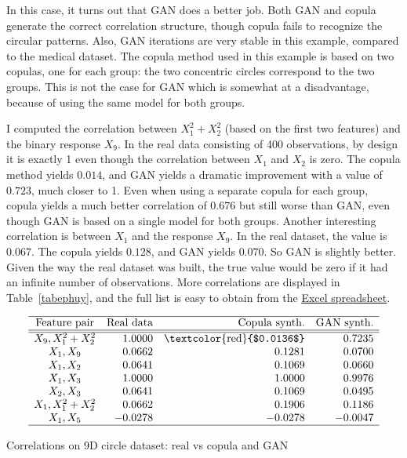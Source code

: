 \documentclass[oneside,10pt]{book}
\renewcommand{\arraystretch}{1.4} %
\begin{document}
In this case, it turns out that GAN does a better job. Both GAN and copula generate the correct correlation structure, though copula fails to recognize the circular patterns. Also, GAN iterations are very stable in this example, compared to the medical dataset.
The copula method used in this example is based on two copulas, one for each group: the two concentric circles correspond to the two groups. This is not the case for GAN which is  somewhat at a disadvantage,
 because of using the same model for both groups.

I computed the correlation between $X_1^2 + X_2^2$ (based on the first two features) and the binary response $X_9$. In the real data consisting of 400 observations, by design it is exactly 1 even though the correlation between $X_1$ and $X_2$ is zero.
The copula method yields $0.014$, and GAN yields a dramatic improvement with a value of $0.723$, much closer to 1. Even when using a separate copula
 for each group, copula yields a much better correlation of $0.676$ but still worse than GAN, even though GAN  is based on  a single model for both groups. Another interesting correlation is between $X_1$ and the response $X_9$. In the real dataset,
 the value is $0.067$. The copula yields
$0.128$, and GAN yields $0.070$.  So GAN is slightly better.
Given the way the real dataset was built, the true value would be zero if it had an infinite number
of observations.  More correlations are displayed in Table~\ref{tabephuy}, and the full list is easy to obtain from the
\href{https://github.com/VincentGranville/Main/blob/main/circle8D.xlsx}{Excel spreadsheet}.


\renewcommand{\arraystretch}{1.2} %
\renewcommand{\arraystretch}{1.2} %
\begin{table}[H]
\[
\begin{array}{crrr}
\hline
 \text{Feature pair} &  \text{Real data} & \text{Copula synth.} & \text{GAN synth.} \\
\hline
\hline
X_9, X_1^2+X_2^2  & 1.0000 & \text{\textcolor{red}{$0.0136$}} & 0.7235 \\
X_1, X_9 &  0.0662&	0.1281 &	0.0700\\
X_1, X_2 &  0.0641 &	0.1069 &	0.0660\\
X_1, X_3 & 1.0000 &	1.0000 &	0.9976 \\
 X_2, X_3 & 0.0641 &	0.1069 &	0.0495\\
 X_1, X_1^2+X_2^2 & 0.0662 &	0.1906 &	0.1186\\
 X_1, X_5 & -0.0278 & -0.0278 &	-0.0047\\

\hline
\end{array}
\]
\caption{\label{tabephuy} Correlations on 9D circle dataset: real vs copula and GAN}
\end{table}
\end{document}
